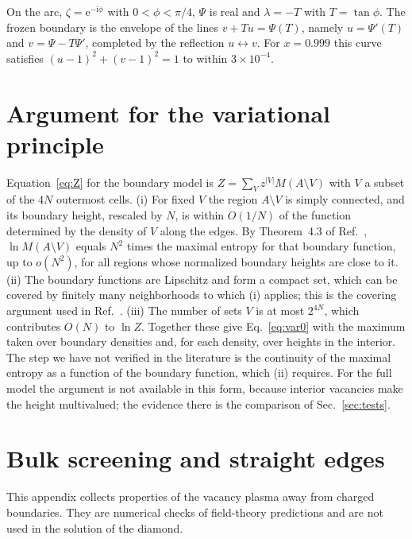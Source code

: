 \documentclass[reprint,aps,pre,superscriptaddress,longbibliography,floatfix,amsmath,amssymb]{revtex4-2}
\newcommand{\ee}{\mathrm{e}}
\newcommand{\ii}{\mathrm{i}}
\begin{document}
On the arc, $\zeta=\ee^{-\ii\phi}$ with $0<\phi<\pi/4$, $\Psi$ is real and $\lambda=-T$ with $T=\tan\phi$. The frozen boundary is the envelope of the lines $v+Tu=\Psi(T)$, namely $u=\Psi'(T)$ and $v=\Psi-T\Psi'$, completed by the reflection $u\leftrightarrow v$. For $x=0.999$ this curve satisfies $(u-1)^2+(v-1)^2=1$ to within $3\times10^{-4}$.

\section{Argument for the variational principle}\label{app:variational}

Equation~\eqref{eq:Z} for the boundary model is $Z=\sum_Vz^{|V|}M(A\setminus V)$ with $V$ a subset of the $4N$ outermost cells. (i) For fixed $V$ the region $A\setminus V$ is simply connected, and its boundary height, rescaled by $N$, is within $O(1/N)$ of the function determined by the density of $V$ along the edges. By Theorem~4.3 of Ref.~\cite{cohn2001}, $\ln M(A\setminus V)$ equals $N^2$ times the maximal entropy for that boundary function, up to $o(N^2)$, for all regions whose normalized boundary heights are close to it. (ii) The boundary functions are Lipschitz and form a compact set, which can be covered by finitely many neighborhoods to which (i) applies; this is the covering argument used in Ref.~\cite{cohn2001}. (iii) The number of sets $V$ is at most $2^{4N}$, which contributes $O(N)$ to $\ln Z$. Together these give Eq.~\eqref{eq:var0} with the maximum taken over boundary densities and, for each density, over heights in the interior. The step we have not verified in the literature is the continuity of the maximal entropy as a function of the boundary function, which (ii) requires. For the full model the argument is not available in this form, because interior vacancies make the height multivalued; the evidence there is the comparison of Sec.~\ref{sec:tests}.

\section{Bulk screening and straight edges}\label{app:bulk}

This appendix collects properties of the vacancy plasma away from charged boundaries. They are numerical checks of field-theory predictions and are not used in the solution of the diamond.
\end{document}
